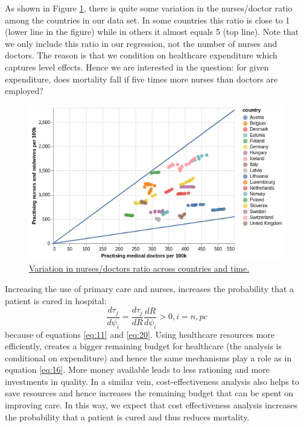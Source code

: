 \documentclass[a4paper,12pt]{article}
\begin{document}
As shown in Figure \ref{fig:nurses_doctors}, there is quite some variation in the nurses/doctor ratio among the countries in our data set. In some countries this ratio is close to 1 (lower line in the figure) while in others it almost equals 5 (top line). Note that we only include this ratio in our regression, not the number of nurses and doctors. The reason is that we condition on healthcare expenditure which captures level effects. Hence we are interested in the question: for given expenditure, does mortality fall if five times more nurses than doctors are employed?

\begin{figure}[htbp]
\centering
\includegraphics[width=.9\linewidth]{./figures/doctors_nurses.png}
\caption{\label{fig:nurses_doctors}\href{https://janboone.github.io/European-Healthcare-Systems/figures/doctors\_nurses.html}{Variation in nurses/doctors ratio across countries and time.}}
\end{figure}

Increasing the use of primary care and nurses, increases the probability that a patient is cured in hospital:
\begin{equation}
\label{eq:15}
\frac{d\tau_j}{d \psi_i} = \frac{d\tau_j}{dR} \frac{dR}{d \psi_i} > 0, i = n, pc
\end{equation}
because of equations \eqref{eq:11} and \eqref{eq:20}. Using healthcare resources more efficiently, creates a bigger remaining budget for healthcare (the analysis is conditional on expenditure) and hence the same mechanisms play a role as in equation \eqref{eq:16}. More money available leads to less rationing and more investments in quality. In a similar vein, cost-effectiveness analysis also helps to save resources and hence increases the remaining budget that can be spent on improving care. In this way, we expect that cost effectiveness analysis increases the probability that a patient is cured and thus reduces mortality.
\end{document}
